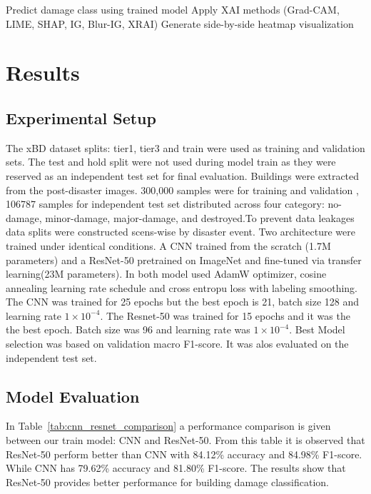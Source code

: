 \documentclass[conference]{IEEEtran}
\begin{document}
{{\begin{algorithm}[H]
\begin{algorithmic}[1]
    \STATE Predict damage class using trained model
    \STATE Apply XAI methods (Grad-CAM, LIME, SHAP, IG, Blur-IG, XRAI)
    \STATE Generate side-by-side heatmap visualization
\ENDFOR

\end{algorithmic}
\end{algorithm}




\section{Results}


\subsection{Experimental Setup}
The xBD dataset splits: tier1, tier3 and train were used as training and validation sets. The test and hold split were not used during model train as they were reserved as an independent test set for final evaluation. Buildings were extracted from the post-disaster images. 300,000 samples were for training and validation , 106787 samples for independent test set distributed across four category: no-damage, minor-damage, major-damage, and destroyed.To prevent data leakages data splits were constructed scens-wise by disaster event.
Two architecture were trained under identical conditions. A CNN trained from the scratch (1.7M parameters) and a ResNet-50 pretrained on ImageNet and fine-tuned via transfer learning(23M parameters). In both model used AdamW optimizer, cosine annealing learning rate schedule and cross entropu loss with labeling smoothing. The CNN was trained for 25 epochs but the best epoch is 21, batch size 128 and learning rate $1 \times 10^{-4}$. The Resnet-50 was trained for 15 epochs and it was the the best epoch. Batch size was 96 and learning rate was $1 \times 10^{-4}$. Best Model selection was based on validation macro F1-score. It was alos evaluated on the independent test set.
\subsection{Model Evaluation}

 In Table~\ref{tab:cnn_resnet_comparison} a performance comparison is given between our train model: CNN and ResNet-50. From this table it is observed that ResNet-50 perform better than CNN with  84.12\% accuracy and 84.98\% F1-score. While CNN has 79.62\% accuracy and 81.80\% F1-score. The results show that ResNet-50 provides better  performance for building damage classification.

}}
\end{document}
